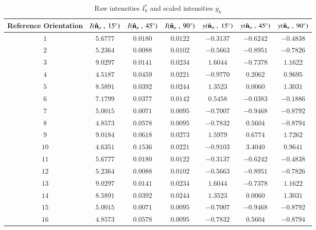 \documentclass[final, 3p]{elsarticle}
\begin{document}
\newpage
\begin{table}[h]
  \begin{center}
    \caption{\label{tab:A2}
      Raw intensities $I_k^*$ and scaled intensities $y_k$}
    \begin{tabular}{|c|c|c|c|c|c|c|}
      \hline\hline
      Reference Orientation  & $I(\hat{\bf n}_\alpha\ ,\ 15^{\circ})$ &  $I(\hat{\bf n}_\alpha \ , \ 45^{\circ})$ &  $I(\hat{\bf n}_\alpha \ ,\ 90^{\circ})$ & $y(\hat{\bf n}_\alpha \ , \ 15^{\circ})$ & $y(\hat{\bf n}_\alpha \ , \ 45^{\circ})$ & $y(\hat{\bf n}_\alpha \ , \ 90^{\circ})$ \\
\hline
$1$  & $5.6777$ & $0.0180$ & $0.0122$ & $-0.3137$ & $-0.6242$ & $-0.4838$ \\
$2$  & $5.2364$ & $0.0088$ & $0.0102$ & $-0.5663$ & $-0.8951$ & $-0.7826$ \\
$3$  & $9.0297$ & $0.0141$ & $0.0234$ & $ 1.6044$ & $-0.7378$ & $ 1.1622$ \\
$4$  & $4.5187$ & $0.0459$ & $0.0221$ & $-0.9770$ & $ 0.2062$ & $ 0.9695$ \\
$5$  & $8.5891$ & $0.0392$ & $0.0244$ & $ 1.3523$ & $ 0.0060$ & $ 1.3031$ \\
$6$  & $7.1799$ & $0.0377$ & $0.0142$ & $ 0.5458$ & $-0.0383$ & $-0.1886$ \\
$7$  & $5.0015$ & $0.0071$ & $0.0095$ & $-0.7007$ & $-0.9468$ & $-0.8792$ \\
$8$  & $4.8573$ & $0.0578$ & $0.0095$ & $-0.7832$ & $ 0.5604$ & $-0.8794$ \\
$9$  & $9.0184$ & $0.0618$ & $0.0273$ & $ 1.5979$ & $ 0.6774$ & $ 1.7262$ \\
$10$ & $4.6351$ & $0.1536$ & $0.0221$ & $-0.9103$ & $ 3.4040$ & $ 0.9641$ \\
$11$ & $5.6777$ & $0.0180$ & $0.0122$ & $-0.3137$ & $-0.6242$ & $-0.4838$ \\
$12$ & $5.2364$ & $0.0088$ & $0.0102$ & $-0.5663$ & $-0.8951$ & $-0.7826$ \\
$13$ & $9.0297$ & $0.0141$ & $0.0234$ & $ 1.6044$ & $-0.7378$ & $ 1.1622$ \\
$14$ & $8.5891$ & $0.0392$ & $0.0244$ & $ 1.3523$ & $ 0.0060$ & $ 1.3031$ \\
$15$ & $5.0015$ & $0.0071$ & $0.0095$ & $-0.7007$ & $-0.9468$ & $-0.8792$ \\
$16$ & $4.8573$ & $0.0578$ & $0.0095$ & $-0.7832$ & $ 0.5604$ & $-0.8794$ \\

\end{tabular}
\end{center}
\end{table}
\end{document}
